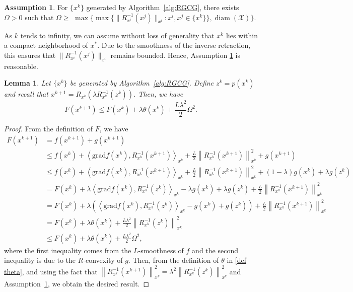 \documentclass[pdflatex,sn-mathphys-num]{sn-jnl}%
\newtheorem{lemma}[theorem]{Lemma} %
\theoremstyle{definition} %
\newtheorem{assumption}{Assumption} %
\theoremstyle{remark} %
\newcommand{\grad}{\mathrm{grad}}
\begin{document}
\begin{assumption}\label{assu:omega}
    For $\{x^k\}$ generated by Algorithm~\ref{alg:RGCG}, there exists $\Omega>0$ such that $\Omega \geq$ $\max \big\{\max \big\{ \|R_{x^i}^{-1} (x^j)\|_{x^i}: {x^i}, {x^j} \in \{x^k\} \big\}, \operatorname{diam}(\mathcal{X})\big\}$.
\end{assumption}

As \(k\) tends to infinity, we can assume without loss of generality that \(x^k\) lies within a compact neighborhood of \(x^*\). Due to the smoothness of the inverse retraction, this ensures that \(\|R_{x^i}^{-1}(x^j)\|_{x^i}\) remains bounded. Hence, Assumption \ref{assu:omega} is reasonable.
\begin{lemma}\label{lemma:des}
    Let $\{x^k\}$ be generated by Algorithm~\ref{alg:RGCG}. Define $z^k = p(x^k) $ and  recall that $x^{k+1}= R_{x^k}(\lambda R^{-1}_{x^k}(z^k))$.
    Then,
    we have
    \begin{equation}
        F(x^{k+1}) \leq F(x^k)+ \lambda\theta (x^k) +\frac{L\lambda^2}{2}\Omega^2.
    \end{equation} 
\end{lemma}
\begin{proof}
    
    From the definition of $F$, we have
    $$
    \begin{aligned}
    F(x^{k+1}) &= f(x^{k+1}) +g(x^{k+1}) \\
    &\leq f(x^k)+\left\langle\grad f(x^k), R^{-1}_{x^k}(x^{k+1})\right\rangle_{x^k} +\frac{L}{2}\left\|{R}_{x^k}^{-1}(x^{k+1})\right\|^2_{x^k}+g(x^{k+1}) \\
    &\leq f(x^k)+\left\langle\grad f(x^k), R^{-1}_{x^k}(x^{k+1})\right\rangle_{x^k} +\frac{L}{2}\left\|{R}_{x^k}^{-1}(x^{k+1})\right\|^2_{x^k}+(1-\lambda)g(x^k) +\lambda g(z^k) \\
    &= F(x^k) + \lambda\left\langle\grad f(x^k), R^{-1}_{x^k}(z^k)\right\rangle_{x^k} -\lambda g(x^k) +\lambda g(z^k) +\frac{L}{2}\left\|{R}_{x^k}^{-1}(x^{k+1})\right\|^2_{x^k}\\
    &= F(x^k) + \lambda \left(\left\langle\grad f(x^k), R^{-1}_{x^k}(z^k)\right\rangle_{x^k} - g(x^k) + g(z^k)\right) +\frac{L}{2}\left\|{R}_{x^k}^{-1}(x^{k+1})\right\|^2_{x^k}\\
    &= F(x^k)+ \lambda\theta (x^k) +\frac{L\lambda^2}{2}\left\|{R}_{x^k}^{-1}(z^k)\right\|^2_{x^k}\\
    &\leq F(x^k)+ \lambda\theta (x^k) +\frac{L\lambda^2}{2}\Omega^2,
    \end{aligned}
    $$
    where the first inequality comes from the $L$-smoothness of $f$ and the second inequality is due to the $R$-convexity of $g$. Then, from the definition of $\theta$ in \eqref{def theta}, and using the fact that $\left\|{R}_{x^k}^{-1}(x^{k+1})\right\|^2_{x^k} = \lambda^2 \left\|{R}_{x^k}^{-1}(z^k)\right\|^2_{x^k}$ and  Assumption~\ref{assu:omega}, we obtain the desired result.
\end{proof}
\end{document}
